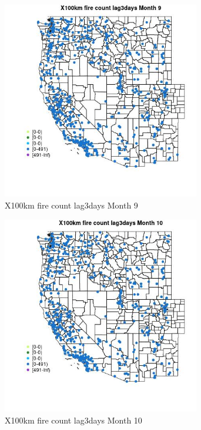 \begin{figure} 
\centering  
\includegraphics[width=0.77\textwidth]{Code_Outputs/Report_ML_input_PM25_Step4_part_e_de_duplicated_aves_compiled_2019-05-14wNAs_MapObsMo9X100km_fire_count_lag3days.jpg} 
\caption{\label{fig:Report_ML_input_PM25_Step4_part_e_de_duplicated_aves_compiled_2019-05-14wNAsMapObsMo9X100km_fire_count_lag3days}X100km fire count lag3days Month 9} 
\end{figure} 
 

\begin{figure} 
\centering  
\includegraphics[width=0.77\textwidth]{Code_Outputs/Report_ML_input_PM25_Step4_part_e_de_duplicated_aves_compiled_2019-05-14wNAs_MapObsMo10X100km_fire_count_lag3days.jpg} 
\caption{\label{fig:Report_ML_input_PM25_Step4_part_e_de_duplicated_aves_compiled_2019-05-14wNAsMapObsMo10X100km_fire_count_lag3days}X100km fire count lag3days Month 10} 
\end{figure} 
 

